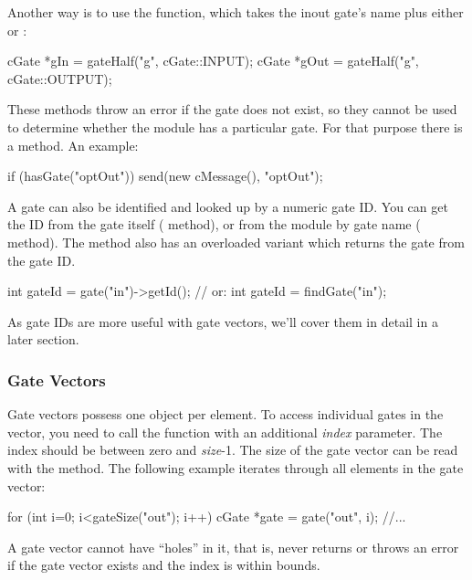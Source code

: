 Another way is to use the  function, which takes
the inout gate's name plus either  or :

\begin{cpp}
cGate *gIn = gateHalf("g", cGate::INPUT);
cGate *gOut = gateHalf("g", cGate::OUTPUT);
\end{cpp}

These methods throw an error if the gate does not exist, so they cannot
be used to determine whether the module has a particular gate.
For that purpose there is a  method. An example:

\begin{cpp}
if (hasGate("optOut"))
   send(new cMessage(), "optOut");
\end{cpp}

A gate can also be identified and looked up by a numeric gate ID.
You can get the ID from the gate itself ( method),
or from the module by gate name ( method).
The  method also has an overloaded variant which
returns the gate from the gate ID.

\begin{cpp}
int gateId = gate("in")->getId();  // or:
int gateId = findGate("in");
\end{cpp}

As gate IDs are more useful with gate vectors, we'll cover them
in detail in a later section.


\subsubsection{Gate Vectors}

Gate vectors possess one  object per element.
To access individual gates in the vector, you need to call
the  function with an additional \textit{index}
parameter. The index should be between zero and \textit{size}-1.
The size of the gate vector can be read with the 
method. The following example iterates through all elements in the
gate vector:

\begin{cpp}
for (int i=0; i<gateSize("out"); i++) {
    cGate *gate = gate("out", i);
    //...
}
\end{cpp}

A gate vector cannot have ``holes'' in it, that is, 
never returns  or throws an error if the gate vector exists
and the index is within bounds.

